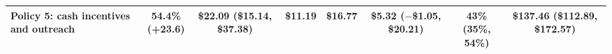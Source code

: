 \begin{tabular}{>{\raggedright\arraybackslash}p{2.7cm}ccccccc}
Policy 5: cash incentives and outreach & \makecell{54.4\% \\ {\footnotesize (+23.6)}} & \makecell{\$22.09 \\ {\footnotesize (\$15.14, \$37.38)}} & \$11.19 & \$16.77 & \makecell{\$5.32 \\ {\footnotesize ($-$\$1.05, \$20.21)}} & \makecell{43\% \\ {\footnotesize (35\%, 54\%)}} & \makecell{\$137.46 \\ {\footnotesize (\$112.89, \$172.57)}} \\
\bottomrule
\end{tabular}
